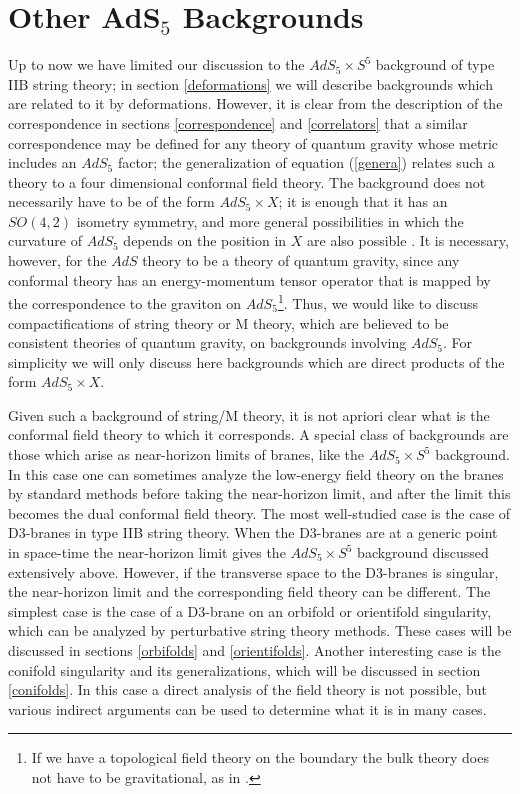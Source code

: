 \section{Other AdS$_5$ Backgrounds}
\label{other_backgrounds}

Up to now we have limited our discussion to the $AdS_5\times S^5$
background of type IIB string theory; in section \ref{deformations}
we will describe backgrounds which are
related to it by deformations. However, 
it is clear from the
description of the correspondence in sections \ref{correspondence} and
\ref{correlators} that a similar
correspondence may be defined for any theory of quantum gravity whose
metric includes an $AdS_5$ factor; the generalization of
equation (\ref{genera}) relates such a theory
to a four dimensional conformal field theory. The background does not
necessarily have to be of the form $AdS_5\times X$; it is enough that
it has an $SO(4,2)$ isometry symmetry, and more general possibilities
in which the curvature of $AdS_5$ depends on the position in $X$ are
also possible \cite{vanNieuwenhuizen:1985ri}. It is necessary,
however, for the $AdS$ theory to be a theory of quantum gravity, since
any conformal theory has an energy-momentum tensor operator that is
mapped by the correspondence to the graviton on $AdS_5$\footnote{If we
have a topological field theory on the boundary the bulk theory does
not have to be gravitational, as in \cite{Gopakumar:1998ki}.}. Thus,
we would like to discuss compactifications of string theory or M
theory, which are believed to be consistent theories of quantum
gravity, on backgrounds involving $AdS_5$. For simplicity we will only
discuss here backgrounds which are direct products of the form
$AdS_5\times X$.

Given such a background of string/M theory, it is not apriori clear
what is the conformal field theory to which it corresponds. A special
class of backgrounds are those which arise as near-horizon limits of
branes, like the $AdS_5\times S^5$ background. In this case one can
sometimes analyze the low-energy field theory on the branes by
standard methods before taking the near-horizon limit, and after the
limit this becomes the dual conformal field theory. The most
well-studied case is the case of D3-branes in type IIB string
theory. When the D3-branes are at a generic point in space-time the
near-horizon limit gives the $AdS_5\times S^5$ background discussed
extensively above. However, if the transverse space to the D3-branes
is singular, the near-horizon limit and the corresponding field theory
can be different. The simplest case is the case of a D3-brane on an
orbifold \cite{Kachru:1998ys} or orientifold \cite{Witten:1998xy}
singularity, which can be analyzed by perturbative string theory
methods. These cases will be discussed in sections \ref{orbifolds} and
\ref{orientifolds}. Another interesting case is the conifold
singularity \cite{Klebanov:1998hh} and its generalizations, which will
be discussed in section \ref{conifolds}. In this case a direct
analysis of the field theory is not possible, but various indirect
arguments can be used to determine what it is in many cases.

